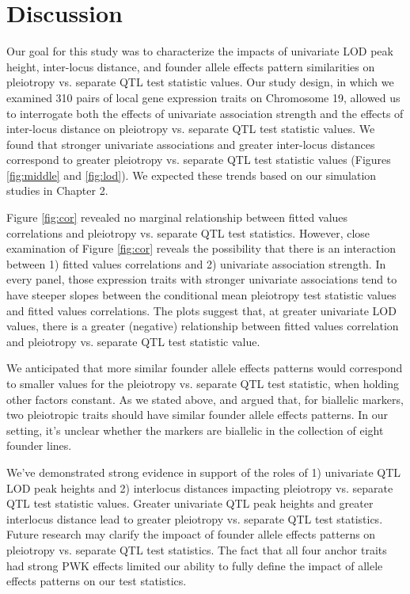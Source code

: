 \documentclass{article}
\begin{document}
\section{Discussion}

Our goal for this study was to characterize the impacts of univariate LOD peak height, inter-locus distance, and founder allele effects pattern similarities on pleiotropy vs. separate QTL test statistic values. Our study design, in which we examined 310 pairs of local gene expression traits on Chromosome 19, allowed us to interrogate both the effects of univariate association strength and the effects of inter-locus distance on pleiotropy vs. separate QTL test statistic values. We found that stronger univariate associations and greater inter-locus distances correspond to greater pleiotropy vs. separate QTL test statistic values (Figures \ref{fig:middle} and \ref{fig:lod}). We expected these trends based on our simulation studies in Chapter 2.

Figure \ref{fig:cor} revealed no marginal relationship between fitted values correlations and pleiotropy vs. separate QTL test statistics. However, close examination of Figure \ref{fig:cor} reveals the possibility that there is an interaction between 1) fitted values correlations and 2) univariate association strength. In every panel, those expression traits with stronger univariate associations tend to have steeper slopes between the conditional mean pleiotropy test statistic values and fitted values correlations. The plots suggest that, at greater univariate LOD values, there is a greater (negative) relationship between fitted values correlation and pleiotropy vs. separate QTL test statistic value. 

We anticipated that more similar founder allele effects patterns would correspond to smaller values for the pleiotropy vs. separate QTL test statistic, when holding other factors constant. As we stated above, \citet{macdonald2007joint} and \citet{king2012genetic} argued that, for biallelic markers, two pleiotropic traits should have similar founder allele effects patterns. In our setting, it's unclear whether the markers are biallelic in the collection of eight founder lines. 

We've demonstrated strong evidence in support of the roles of 1) univariate QTL LOD peak heights and 2) interlocus distances impacting pleiotropy vs. separate QTL test statistic values. Greater univariate QTL peak heights and greater interlocus distance lead to greater pleiotropy vs. separate QTL test statistics. Future research may clarify the impoact of founder allele effects patterns on pleiotropy vs. separate QTL test statistics. The fact that all four anchor traits had strong PWK effects limited our ability to fully define the impact of allele effects patterns on our test statistics.
\end{document}
